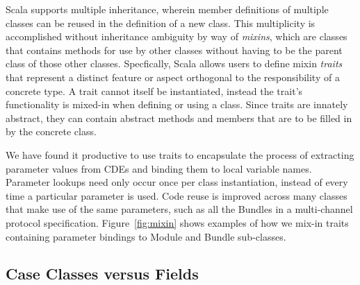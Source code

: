 Scala supports multiple inheritance, wherein member definitions of multiple classes can be reused in the definition of a new class.
This multiplicity is accomplished without inheritance ambiguity by way of {\em mixins},
which are classes that contains methods for use by other classes without having to be the parent class of those other classes.
Specfically, Scala allows users to define mixin {\em traits}
that represent a distinct feature or aspect orthogonal to the responsibility of a concrete type.
A trait cannot itself be instantiated, instead the trait's functionality is mixed-in when defining or using a class.
Since traits are innately abstract, they can contain abstract methods and members that are to be filled in by the concrete class.

We have found it productive to use traits to encapsulate the process of extracting parameter values from CDEs and binding them to local variable names.
Parameter lookups need only occur once per class instantiation, instead of every time a particular parameter is used.
Code reuse is improved across many classes that make use of the same parameters, such as all the Bundles in
a multi-channel protocol specification.
Figure~\ref{fig:mixin} shows examples of how we mix-in traits containing parameter bindings to Module and Bundle sub-classes.

\subsection{Case Classes versus Fields}

